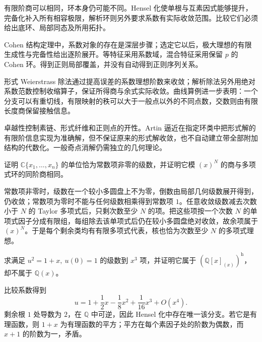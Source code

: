 \begin{chaptersummary}
	有限阶商可以相同，环本身仍可能不同。Hensel 化使单根与互素因式能够提升，完备化补入所有相容极限，解析环则另外要求系数有实际收敛范围。比较它们必须给出底环、局部同态及所用拓扑。

	\ProseParagraphBreak
	Cohen 结构定理中，系数对象的存在是深层步骤；选定它以后，极大理想的有限生成性与完备性给出逐阶展开。等特征采用系数域，混合特征采用保留 \(p\) 的 Cohen 环。得到正则局部覆盖，并没有自动得到正则序列关系。

	\ProseParagraphBreak
	形式 Weierstrass 除法通过提高误差的系数理想阶数来收敛；解析除法另外用绝对系数范数控制收缩算子，保证所得商与余式实际收敛。曲线算例进一步表明：一个分支可以有重切线，有限映射的秩可以大于一般点以外的不同点数，交数则由有限长度商保留接触信息。

	\ProseParagraphBreak
	卓越性控制素链、形式纤维和正则点的开性。Artin 逼近在指定环类中把形式解的有限阶信息实现为准确解，但不保证原来的形式解收敛，也不自动建立带全部附加结构的代数化。一般奇点消解仍需独立的几何理论。
\end{chaptersummary}

\BookExercises

\begin{exercise}\label{b3:ex:D-local-units-truncations}
	证明 \(\mathbb C\{x_1,\ldots,x_n\}\) 的单位恰为常数项非零的级数，并证明它模 \((x)^N\) 的商与多项式环的同阶商相同。
\end{exercise}
\begin{solution}
	常数项非零时，级数在一个较小多圆盘上不为零，倒数由局部几何级数展开得到，仍收敛；常数项为零时不能与任何级数相乘得到常数项 \(1\)。任意收敛级数减去次数小于 \(N\) 的 Taylor 多项式后，只剩次数至少 \(N\) 的项。把这些项按一个次数 \(N\) 的单项式因子分成有限组，每组除去该单项式后仍在较小多圆盘绝对收敛，故余项属于 \((x)^N\)。于是每个剩余类均有有限多项式代表，核也恰为次数至少 \(N\) 的多项式理想。
\end{solution}

\begin{optionalexercise}\label{b3:ex:D-hensel-not-rational}
	求满足 \(u^2=1+x,\ u(0)=1\) 的级数到 \(x^3\) 项，并证明它属于 \((\mathbb Q[x]_{(x)})^{\mathrm h}\)，却不属于 \(\mathbb Q(x)\)。
\end{optionalexercise}
\begin{solution}
	比较系数得到
	\[
		u=1+\frac12x-\frac18x^2+\frac1{16}x^3+O(x^4).
	\]
	剩余根 \(1\) 处导数为 \(2\)，在 \(\mathbb Q\) 中可逆，因此 Hensel 化中存在唯一该分支。若它是有理函数，则 \(1+x\) 为有理函数的平方；平方在每个素因子处的阶数为偶数，而 \(x+1\) 的阶数为一，矛盾。
\end{solution}

